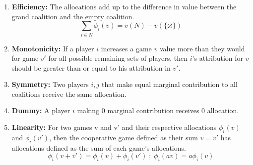 \documentclass[runningheads]{llncs}
\begin{document}
    \begin{enumerate}
        \item \textbf{Efficiency:} The allocations add up to the difference in value between the grand coalition and the empty coalition.
        \begin{equation}%
            \label{eq: Efficiency}
                \sum_{i \in N}{\phi_i(v) = v(N) - v(\{\varnothing\})}
        \end{equation}
        
        \item \textbf{Monotonicity:} If a player $i$ increases a game $v$ value more than they would for game $v'$ for all possible remaining sets of players, then $i$'s attribution for $v$ should be greater than or equal to his attribution in $v'$. 
        
        
        \item \textbf{Symmetry:} Two players $i,j$ that make equal marginal contribution to all coalitions receive the same allocation.
        
        \item \textbf{Dummy:} A player $i$ making 0 marginal contribution receives 0 allocation.
        
        \item \textbf{Linearity:} For two games v and v' and their respective allocations $\phi_i(v)$ and $\phi_i(v')$, then the cooperative game defined as their sum $v = v'$ has allocations defined as the sum of each game's allocations.
        \begin{equation}
        \label{eq: Linearity}
            \phi_i(v + v') = \phi_i(v) + \phi_i(v')
            \; ; \; \phi_i(av) = a \phi_i(v)
        \end{equation}
    \end{enumerate}
    
\end{document}
